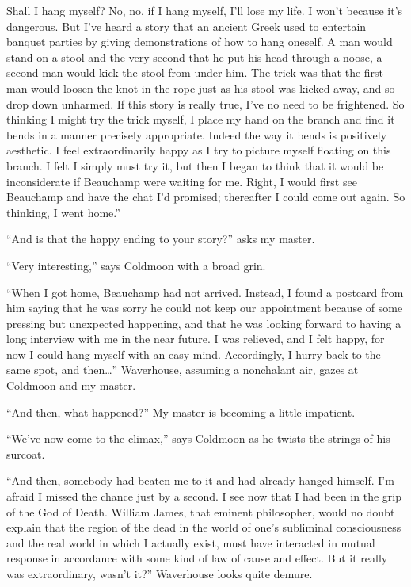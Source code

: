 \documentclass{book}
\begin{document}
Shall I hang myself? No, no, if I hang myself, I'll lose my life. I
won't because it's dangerous. But I've heard a story that an ancient
Greek used to entertain banquet parties by giving demonstrations of how
to hang oneself. A man would stand on a stool and the very second that
he put his head through a noose, a second man would kick the stool from
under him. The trick was that the first man would loosen the knot in the
rope just as his stool was kicked away, and so drop down unharmed. If
this story is really true, I've no need to be frightened. So thinking I
might try the trick myself, I place my hand on the branch and find it
bends in a manner precisely appropriate. Indeed the way it bends is
positively aesthetic. I feel extraordinarily happy as I try to picture
myself floating on this branch. I felt I simply must try it, but then I
began to think that it would be inconsiderate if Beauchamp were waiting
for me. Right, I would first see Beauchamp and have the chat I'd
promised; thereafter I could come out again. So thinking, I went home.''

``And is that the happy ending to your story?'' asks my master.

``Very interesting,'' says Coldmoon with a broad grin.

``When I got home, Beauchamp had not arrived. Instead, I found a
postcard from him saying that he was sorry he could not keep our
appointment because of some pressing but unexpected happening, and that
he was looking forward to having a long interview with me in the near
future. I was relieved, and I felt happy, for now I could hang myself
with an easy mind. Accordingly, I hurry back to the same spot, and
then\ldots{}'' Waverhouse, assuming a nonchalant air, gazes at Coldmoon
and my master.

``And then, what happened?'' My master is becoming a little impatient.

``We've now come to the climax,'' says Coldmoon as he twists the strings
of his surcoat.

``And then, somebody had beaten me to it and had already hanged himself.
I'm afraid I missed the chance just by a second. I see now that I had
been in the grip of the God of Death. William James, that eminent
philosopher, would no doubt explain that the region of the dead in the
world of one's subliminal consciousness and the real world in which I
actually exist, must have interacted in mutual response in accordance
with some kind of law of cause and effect. But it really was
extraordinary, wasn't it?'' Waverhouse looks quite demure.
\end{document}
